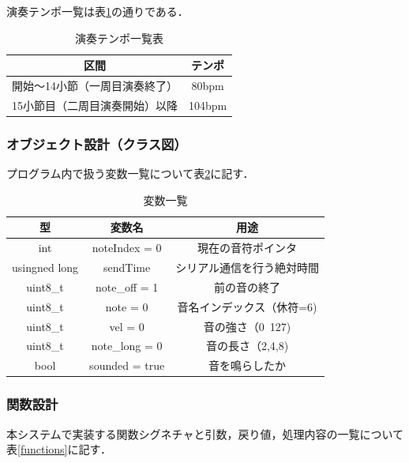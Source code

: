 演奏テンポ一覧は表\ref{temp}の通りである．

\begin{table}[h]
  \centering
  \caption{演奏テンポ一覧表}
  \label{temp}
  \begin{tabular}{|c|c|}
\hline
区間 & テンポ  \\\hline \hline
開始〜14小節（一周目演奏終了） & 80bpm \\ \hline
15小節目（二周目演奏開始）以降 & 104bpm  \\ \hline

  \end{tabular}  
\end{table}
\FloatBarrier


\subsubsection{オブジェクト設計（クラス図）}

プログラム内で扱う変数一覧について表\ref{variable}に記す．
\begin{table}[H]
  \centering
  \caption{変数一覧}
  \label{variable}
  \begin{tabular}{|c|c|c|}
\hline
型 & 変数名 & 用途 \\\hline \hline
int & noteIndex = 0 & 現在の音符ポインタ \\ \hline
usingned long & sendTime & シリアル通信を行う絶対時間 \\ \hline
uint8\_t & note\_off = 1 & 前の音の終了 \\ \hline
uint8\_t & note = 0 & 音名インデックス（休符=6) \\ \hline
uint8\_t & vel = 0 & 音の強さ（0~127) \\ \hline
uint8\_t & note\_long = 0 & 音の長さ（2,4,8) \\ \hline
bool & sounded = true & 音を鳴らしたか \\ \hline

  \end{tabular}  
\end{table}







\subsubsection{関数設計}

本システムで実装する関数シグネチャと引数，戻り値，処理内容の一覧について表\ref{functions}に記す．


